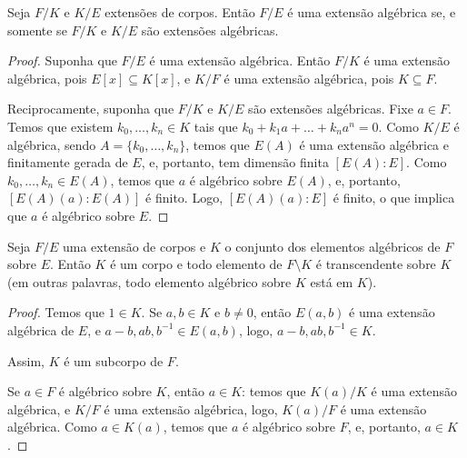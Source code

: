 \begin{prop}
    Seja $F/K$ e $K/E$ extensões de corpos. Então $F/E$ é uma extensão algébrica se, e somente se $F/K$ e $K/E$ são extensões algébricas.
\end{prop}
\begin{proof}
    Suponha que $F/E$ é uma extensão algébrica. Então $F/K$ é uma extensão algébrica, pois $E[x]\subseteq K[x]$, e $K/F$ é uma extensão algébrica, pois $K\subseteq F$.

    Reciprocamente, suponha que $F/K$ e $K/E$ são extensões algébricas. Fixe $a \in F$.
    Temos que existem $k_0, \dots, k_n \in K$ tais que $k_0+k_1a+\dots+k_na^n=0$. Como $K/E$ é algébrica, sendo $A=\{k_0, \dots, k_n\}$, temos que $E(A)$ é uma extensão algébrica e finitamente gerada de $E$, e, portanto, tem dimensão finita $[E(A):E]$. Como $k_0, \dots, k_n \in E(A)$, temos que $a$ é algébrico sobre $E(A)$, e, portanto, $[E(A)(a):E(A)]$ é finito. Logo, $[E(A)(a):E]$ é finito, o que implica que $a$ é algébrico sobre $E$.
\end{proof}

\begin{prop}
    Seja $F/E$ uma extensão de corpos e $K$ o conjunto dos elementos algébricos de $F$ sobre $E$. Então $K$ é um corpo e todo elemento de $F\setminus K$ é transcendente sobre $K$ (em outras palavras, todo elemento algébrico sobre $K$ está em $K$).
\end{prop}

\begin{proof}
    Temos que $1 \in K$.
    Se $a, b \in K$ e $b \neq 0$, então $E(a, b)$ é uma extensão algébrica de $E$, e $a-b, ab, b^{-1} \in E(a, b)$, logo, $a-b, ab, b^{-1}\in K$.

    Assim, $K$ é um subcorpo de $F$.

    Se $a \in F$ é algébrico sobre $K$, então $a \in K$: temos que $K(a)/K$ é uma extensão algébrica, e $K/F$ é uma extensão algébrica, logo, $K(a)/F$ é uma extensão algébrica. Como $a \in K(a)$, temos que $a$ é algébrico sobre $F$, e, portanto, $a \in K$.
\end{proof}

